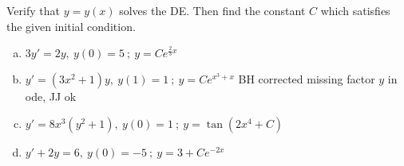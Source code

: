 \documentclass[12pt]{book}
\begin{document}
\begin{exercise}
Verify that $y = y(x)$ solves the DE. Then find the constant $C$ which satisfies the given initial condition.
\begin{enumerate}[a)]
    \item $3y' = 2y,\ y(0)= 5\ ;\ y= Ce^{\frac{2}{3}x}$
    \item 
    {\color{blue}
    $y' = (3x^2 +1)y ,\ y(1)=1 \ ;\ y = C e^{x^{3}+x}$
    }
    {\color{teal}BH corrected missing factor $y$ in ode, JJ ok}
    \item $y' = 8x^3(y^2 +1),\ y(0)=1 \ ;\ y = \tan(2x^4 + C)$
    \item $y'+2y = 6,\ y(0)=-5 \ ;\ y = 3+ C e^{-2x}$
\end{enumerate}
\end{exercise}
\printanswers
\end{document}

